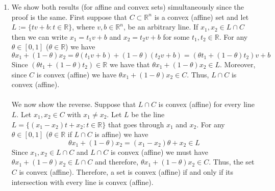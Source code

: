 \documentclass[11pt]{amsart}
\begin{document}
\begin{enumerate}
\item  We show both results (for affine and convex sets) simultaneously since the proof is the same.  First suppose that $C \subset \mathbb{R}^n$ is a convex (affine) set and let $L:=\{tv + b: t\in \mathbb{R}\}$, where $v,b\in \mathbb{R}^n$, be an arbitrary line.  If $x_1,x_2\in L\cap C$ then we can write $x_1 = t_1v + b$ and $x_2 = t_2v + b$ for some $t_1,t_2\in \mathbb{R}$.  For any $\theta \in [0,1]$ ($\theta \in \mathbb{R}$) we have
\[
\theta x_1 + (1-\theta)x_2 = \theta (t_1 v + b) + (1-\theta)(t_2 v + b) = (\theta t_1 + (1 - \theta )t_2)v + b
\]
Since $ (\theta t_1 + (1 - \theta )t_2) \in \mathbb{R}$ we have that $\theta x_1 + (1-\theta)x_2 \in L$.  Moreover, since $C$ is convex (affine) we have $\theta x_1 + (1-\theta)x_2 \in C$.  Thus, $L\cap C$ is convex (affine).\\
\\
We now show the reverse.  Suppose that $L\cap C$ is convex (affine) for every line $L$.  Let $x_1,x_2 \in C$ with $x_1 \neq x_2$.  Let $L$ be the line $L = \{(x_1 - x_2)t + x_2: t\in \mathbb{R}\}$ that goes through $x_1$ and $x_2$.  For any $\theta \in [0,1]$ ($\theta \in \mathbb{R}$ if $L\cap C$ is affine) we have
\[
\theta x_1 + (1 - \theta)x_2 = (x_1 - x_2)\theta + x_2 \in L
\]
Since $x_1,x_2 \in L\cap C$ and $L\cap C$ is convex (affine) we must have $\theta x_1 + (1 - \theta)x_2 \in L\cap C$ and therefore, $\theta x_1 + (1 - \theta)x_2 \in C$.  Thus, the set $C$ is convex (affine).  Therefore, a set is convex (affine) if and only if its intersection with every line is convex (affine).





\vspace{0.5in}


\end{enumerate}
\end{document}
